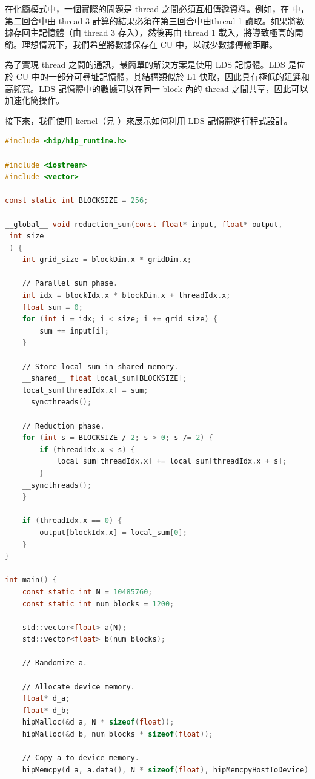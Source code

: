 在化簡模式中，一個實際的問題是 thread 之間必須互相傳遞資料。例如，在   中，第二回合中由 thread 3 計算的結果必須在第三回合中由thread 1 讀取。如果將數據存回主記憶體（由 thread 3 存入），然後再由 thread 1 載入，將導致極高的開銷。理想情況下，我們希望將數據保存在 CU 中，以減少數據傳輸距離。

為了實現 thread 之間的通訊，最簡單的解決方案是使用 LDS 記憶體。LDS 是位於 CU 中的一部分可尋址記憶體，其結構類似於 L1 快取，因此具有極低的延遲和高頻寬。LDS 記憶體中的數據可以在同一 block 內的 thread 之間共享，因此可以加速化簡操作。

接下來，我們使用  kernel（見 ）來展示如何利用 LDS 記憶體進行程式設計。

\begin{lstlisting}[language=C, caption={用 HIP 實作的程式，用於計算陣列中數字的總和。}, captionpos=t, label={lst:sum}]
#include <hip∕hip_runtime.h>

#include <iostream>
#include <vector>

const static int BLOCKSIZE = 256;

__global__ void reduction_sum(const float* input, float* output, 
 int size
 ) {
    int grid_size = blockDim.x * gridDim.x;

    ∕∕ Parallel sum phase.
    int idx = blockIdx.x * blockDim.x + threadIdx.x;
    float sum = 0;
    for (int i = idx; i < size; i += grid_size) {
        sum += input[i];
    }

    ∕∕ Store local sum in shared memory.
    __shared__ float local_sum[BLOCKSIZE];
    local_sum[threadIdx.x] = sum;
    __syncthreads();

    ∕∕ Reduction phase.
    for (int s = BLOCKSIZE ∕ 2; s > 0; s ∕= 2) {
        if (threadIdx.x < s) {
            local_sum[threadIdx.x] += local_sum[threadIdx.x + s];
        }
    __syncthreads();
    }

    if (threadIdx.x == 0) {
        output[blockIdx.x] = local_sum[0];
    }
}

int main() {
    const static int N = 10485760;
    const static int num_blocks = 1200;

    std::vector<float> a(N);
    std::vector<float> b(num_blocks);

    ∕∕ Randomize a.

    ∕∕ Allocate device memory.
    float* d_a;
    float* d_b;
    hipMalloc(&d_a, N * sizeof(float));
    hipMalloc(&d_b, num_blocks * sizeof(float));

    ∕∕ Copy a to device memory.
    hipMemcpy(d_a, a.data(), N * sizeof(float), hipMemcpyHostToDevice);


\end{lstlisting}

